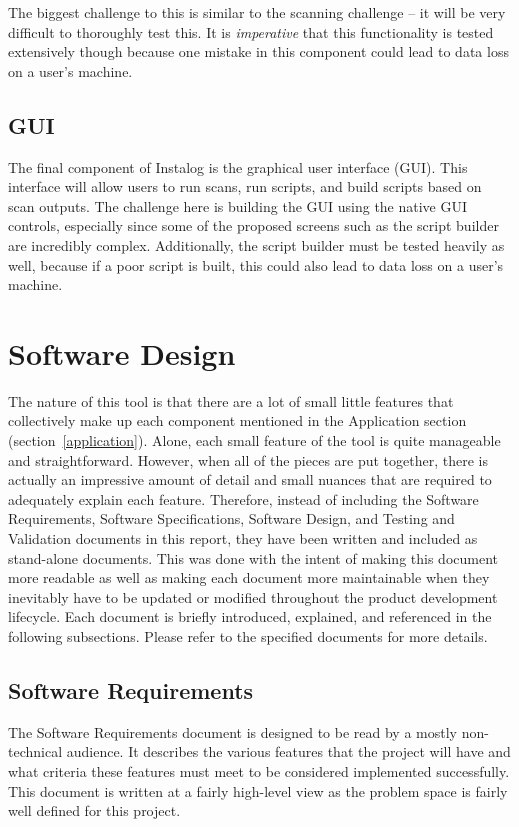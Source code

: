 \documentclass[letterpaper,12pt]{article}
\begin{document}
The biggest challenge to this is similar to the scanning challenge -- it will be
very difficult to thoroughly test this.  It is \textit{imperative} that this
functionality is tested extensively though because one mistake in this component
could lead to data loss on a user's machine.  

\subsection{GUI}
The final component of Instalog is the graphical user interface (GUI).  This
interface will allow users to run scans, run scripts, and build scripts based on
scan outputs.  The challenge here is building the GUI using the native GUI
controls, especially since some of the proposed screens such as the script
builder are incredibly complex.  Additionally, the script builder must be tested
heavily as well, because if a poor script is built, this could also lead to data
loss on a user's machine.  

\newpage



\section{Software Design}
The nature of this tool is that there are a lot of small little features that
collectively make up each component mentioned in the Application section
(section~\ref{application}).  Alone, each small feature of the tool is quite
manageable and straightforward.  However, when all of the pieces are put
together, there is actually an impressive amount of detail and small nuances
that are required to adequately explain each feature.  Therefore, instead of
including the Software Requirements, Software Specifications, Software Design,
and Testing and Validation documents in this report, they have been written and
included as stand-alone documents.  This was done with the intent of making this
document more readable as well as making each document more maintainable when
they inevitably have to be updated or modified throughout the product
development lifecycle.  Each document is briefly introduced, explained, and
referenced in the following subsections.  Please refer to the specified
documents for more details.

\subsection{Software Requirements}
\label{software_requirements}
The Software Requirements document \cite{Requirements} is designed to be read by
a mostly non-technical audience.  It describes the various features that the
project will have and what criteria these features must meet to be considered
implemented successfully.  This document is written at a fairly high-level view
as the problem space is fairly well defined for this project.
\end{document}
